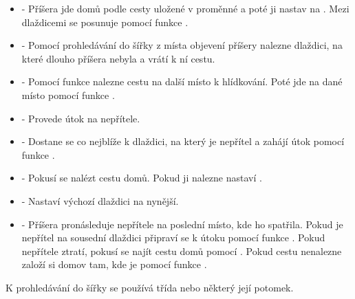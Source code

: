 \begin{itemize}
\item {} - Příšera jde domů podle cesty uložené v proměnné  a poté ji nastav na . 
         Mezi dlaždicemi se posunuje pomocí funkce .

\item {} - Pomocí prohledávání do šířky z místa objevení příšery nalezne dlaždici, na které dlouho
příšera nebyla a vrátí k ní cestu.

\item {} - Pomocí funkce  nalezne cestu na další místo k hlídkování. Poté jde na dané místo
 pomocí funkce .

\item {} - Provede útok na nepřítele.

\item {} - Dostane se co nejblíže k dlaždici, na který je nepřítel a zahájí útok pomocí funkce .

\item {} - Pokusí se nalézt cestu domů. Pokud ji nalezne nastaví .

\item {} - Nastaví výchozí dlaždici na nynější.

\item {} - Příšera pronásleduje nepřítele na poslední místo, kde ho spatřila. Pokud je nepřítel na sousední dlaždici připraví
se k útoku pomocí funkce . Pokud nepřítele ztratí, pokusí se najít cestu domů pomocí . Pokud
cestu nenalezne založí si domov tam, kde je pomocí funkce .

\end{itemize}

K prohledávání do šířky se používá třída  nebo některý její potomek. 










